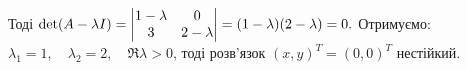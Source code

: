 

Тоді $\det(A - \lambda I) =  \begin{vmatrix} 1 - \lambda & 0 \\ 3 & 2 - \lambda \end{vmatrix} = (1 - \lambda)(2 - \lambda) = 0. \\ $ Отримуємо: $\lambda_1 = 1, \quad \lambda_2 = 2, \quad \Re \lambda > 0$, тоді розв'язок $(x, y)^T = (0, 0)^T $ нестійкий.\\
